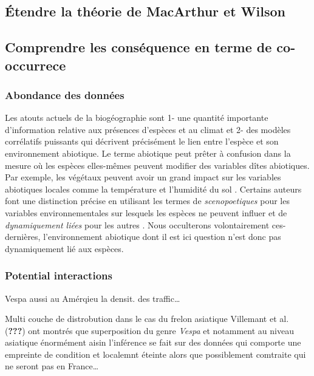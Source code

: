 \subsection*{Étendre la théorie de MacArthur et
Wilson}\label{uxe9tendre-la-thuxe9orie-de-macarthur-et-wilson}

\subsection*{Comprendre les conséquence en terme de
co-occurrece}\label{comprendre-les-consuxe9quence-en-terme-de-co-occurrece}

\subsubsection*{Abondance des données}\label{abondance-des-donnuxe9es}

Les atouts actuels de la biogéographie sont 1- une quantité importante
d'information relative aux présences d'espèces et au climat et 2- des
modèles corrélatifs puissants qui décrivent précisément le lien entre
l'espèce et son environnement abiotique. Le terme abiotique peut prêter
à confusion dans la mesure où les espèces elles-mêmes peuvent modifier
des variables dîtes abiotiques. Par exemple, les végétaux peuvent avoir
un grand impact sur les variables abiotiques locales comme la
température et l'humidité du sol \cite{Breshears1998}. Certains auteurs
font une distinction précise en utilisant les termes de
\textit{scenopoetiques} pour les variables environnementales sur
lesquels les espèces ne peuvent influer et de
\textit{dynamiquement liées} pour les autres \cite{Peterson2011}. Nous
occulterons volontairement ces-dernières, l'environnement abiotique dont
il est ici question n'est donc pas dynamiquement lié aux espèces.

\subsubsection*{Potential interactions}\label{potential-interactions}

Vespa aussi au Amérqieu la densit. des traffic\ldots{}

Multi couche de distrobution dans le cas du frelon asiatique Villemant
et al. ({\textbf{???}}) ont montrés que superposition du genre
\emph{Vespa} et notamment au niveau asiatique énormément aisin
l'inférence se fait sur des données qui comporte une empreinte de
condition et localemnt éteinte alors que possiblement comtraite qui ne
seront pas en France\ldots{}


